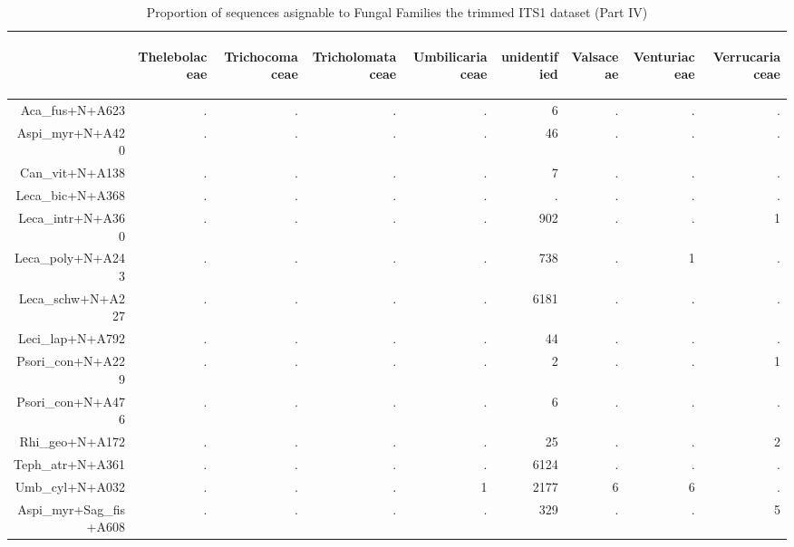 \documentclass[a4paper, 11]{article}\usepackage[]{graphicx}\usepackage[]{color}
\begin{document}
\begin{table}
\centering
\caption[Families ITS1 IV]{Proportion of sequences asignable to Fungal Families the trimmed ITS1 dataset (Part IV)} 
\begin{tabular}{rrrrrrrrr}
  \hline
 & \begin{sideways} Thelebolaceae \end{sideways} & \begin{sideways} Trichocomaceae \end{sideways} & \begin{sideways} Tricholomataceae \end{sideways} & \begin{sideways} Umbilicariaceae \end{sideways} & \begin{sideways} unidentified \end{sideways} & \begin{sideways} Valsaceae \end{sideways} & \begin{sideways} Venturiaceae \end{sideways} & \begin{sideways} Verrucariaceae \end{sideways} \\ 
  \hline
Aca\_fus+N+A623 & . & . & . & . & 6 & . & . & . \\ 
  Aspi\_myr+N+A420 & . & . & . & . & 46 & . & . & . \\ 
  Can\_vit+N+A138 & . & . & . & . & 7 & . & . & . \\ 
  Leca\_bic+N+A368 & . & . & . & . & . & . & . & . \\ 
  Leca\_intr+N+A360 & . & . & . & . & 902 & . & . & 1 \\ 
  Leca\_poly+N+A243 & . & . & . & . & 738 & . & 1 & . \\ 
  Leca\_schw+N+A227 & . & . & . & . & 6181 & . & . & . \\ 
  Leci\_lap+N+A792 & . & . & . & . & 44 & . & . & . \\ 
  Psori\_con+N+A229 & . & . & . & . & 2 & . & . & 1 \\ 
  Psori\_con+N+A476 & . & . & . & . & 6 & . & . & . \\ 
  Rhi\_geo+N+A172 & . & . & . & . & 25 & . & . & 2 \\ 
  Teph\_atr+N+A361 & . & . & . & . & 6124 & . & . & . \\ 
  Umb\_cyl+N+A032 & . & . & . & 1 & 2177 & 6 & 6 & . \\ 
  Aspi\_myr+Sag\_fis+A608 & . & . & . & . & 329 & . & . & 5 \\ 

\end{tabular}
\end{table}
\end{document}

